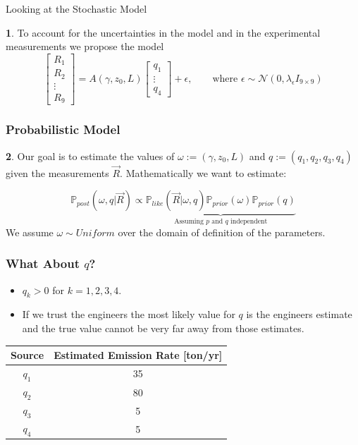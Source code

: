 \documentclass[11pt]{beamer}
\theoremstyle{plain}
\theoremstyle{definition}
\newtheorem{dfn}{}[section]
\newcommand{\p}{\mathbb{P}}
\newcommand{\like}{\p_{like}}
\newcommand{\prior}{\p_{prior}}
\newcommand{\post}{\p_{post}}
\begin{document}
\begin{frame}{Looking at the Stochastic Model}
\begin{dfn}
To account for the uncertainties in the model and in the experimental measurements we propose the model
\begin{equation*}
\begin{bmatrix}
R_{1} \\
R_{2} \\
\vdots\\
R_{9}
\end{bmatrix}=A(\gamma,z_{0},L)
\begin{bmatrix}
q_{1}\\
\vdots\\
q_{4}
\end{bmatrix}+\epsilon,\qquad\text{where }\epsilon\sim \mathcal{N}(0,\lambda_{\epsilon} I_{9\times 9})
\end{equation*}
\end{dfn}
\end{frame}


\begin{frame}
\frametitle{Probabilistic Model}

\begin{dfn}
Our goal is to estimate the values of $\omega:=(\gamma,z_{0},L)$ and 
$q:=(q_{1},q_{2},q_{3},q_{4})$ given the measurements
$\vec{R}$. Mathematically we want to estimate:

\begin{equation*}
\post(\omega,q|\vec{R})\propto
\underbrace{\like(\vec{R}|\omega,q)\prior(\omega)\prior(q)}_{\text{Assuming $p$ and $q$ independent}}
\end{equation*}
We assume $\omega\sim Uniform$ over the domain of definition of the parameters.
 
\end{dfn}
\end{frame}

\begin{frame}
\frametitle{What About $q$?}
\begin{itemize}
\item $q_{k}>0$ for $k=1,2,3,4$.
\item If we trust the engineers the most likely value for $q$ is the engineers estimate and the 
true value cannot be very far away from those estimates.
\end{itemize}

\begin{table}[H]
\centering
\begin{tabular}{|c|c|}
\hline 
Source & Estimated Emission Rate {[}ton/yr{]}\tabularnewline
\hline 
\hline 
$q_{1}$ & 35\tabularnewline
\hline 
$q_{2}$ & 80\tabularnewline
\hline 
$q_{3}$ & 5\tabularnewline
\hline 
$q_{4}$ & 5\tabularnewline
\hline 
\end{tabular}
\end{table}
\end{frame}
\end{document}
